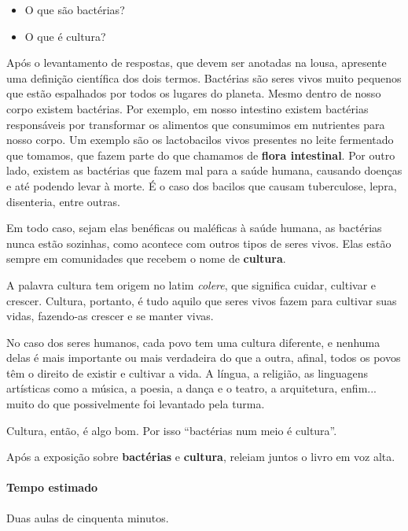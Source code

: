 \documentclass[11pt]{extarticle}
\begin{document}
\begin{itemize}
\item O que são bactérias?
\item O que é cultura?
\end{itemize}

Após o levantamento de respostas, que devem ser anotadas na lousa,
apresente uma definição científica dos dois termos.
Bactérias são seres vivos muito pequenos que estão espalhados
por todos os lugares do planeta. 
Mesmo dentro de nosso corpo existem
bactérias. Por exemplo, em nosso intestino existem bactérias
responsáveis por transformar os alimentos que consumimos
em nutrientes para nosso corpo. Um exemplo são os lactobacilos vivos presentes
no leite fermentado que tomamos, que fazem parte do que chamamos de \textbf{flora intestinal}.
Por outro lado, existem as bactérias que fazem mal para a saúde humana,
causando doenças e até podendo levar à morte. É o caso dos bacilos 
que causam tuberculose, lepra, disenteria, entre outras. 

Em todo caso, sejam elas benéficas ou maléficas à saúde humana, 
as bactérias nunca estão sozinhas, como acontece com outros tipos
de seres vivos. Elas estão sempre em comunidades que recebem o
nome de \textbf{cultura}.


A palavra cultura tem origem no latim \textit{colere}, que significa 
cuidar, cultivar e crescer. Cultura, portanto, é tudo
aquilo que seres vivos fazem para cultivar suas vidas,
fazendo-as crescer e se manter vivas. 

No caso dos seres humanos, cada povo tem uma cultura diferente,
e nenhuma delas é mais importante ou mais verdadeira do que a outra,
afinal, todos os povos têm o direito de existir e cultivar a vida. 
A língua, a religião, as linguagens artísticas como a música,
a poesia, a dança e o teatro, a arquitetura, enfim... muito 
do que possivelmente foi levantado pela turma. 

Cultura, então, é algo bom. Por isso ``bactérias num meio é cultura''.

Após a exposição sobre \textbf{bactérias} e \textbf{cultura},
releiam juntos o livro em voz alta. 

\paragraph{Tempo estimado} Duas aulas de cinquenta minutos.
\end{document}
